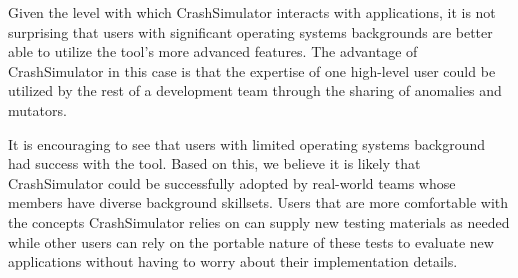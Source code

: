 Given the level with which CrashSimulator interacts with applications, it
is not surprising that users with significant operating systems backgrounds
are better able to utilize the tool's more advanced features.  The
advantage of CrashSimulator in this case is that the expertise of one
high-level user
could be utilized by the rest of a development team through the sharing of
anomalies and mutators.

It is encouraging to see that users with limited operating systems
background had success
with the tool.  Based on this, we believe it is likely that CrashSimulator
could be successfully adopted by real-world teams whose members have
diverse background skillsets.  Users that are more comfortable with the
concepts CrashSimulator relies on can supply new testing materials as
needed while other users can rely on the portable nature of
these tests to evaluate new applications without
having to worry about their implementation details.


